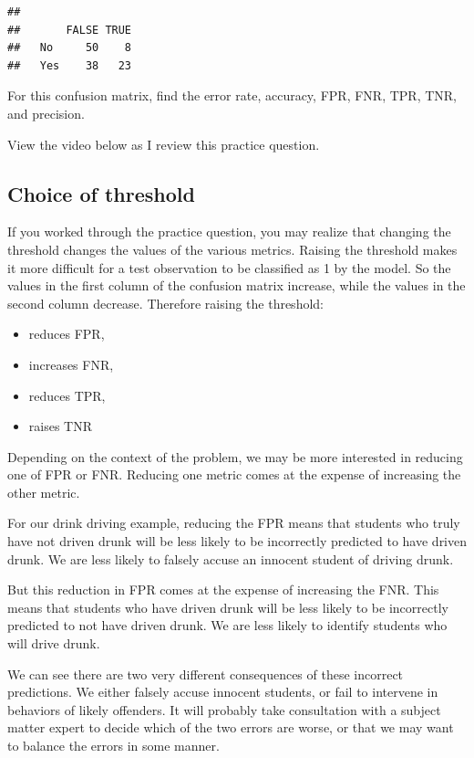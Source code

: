 \documentclass[
]{book}
\providecommand{\tightlist}{%
  \setlength{\itemsep}{0pt}\setlength{\parskip}{0pt}}
\begin{document}
\begin{verbatim}
##      
##       FALSE TRUE
##   No     50    8
##   Yes    38   23
\end{verbatim}

For this confusion matrix, find the error rate, accuracy, FPR, FNR, TPR, TNR, and precision.

View the video below as I review this practice question.

\hypertarget{choice-of-threshold}{%
\subsection{Choice of threshold}\label{choice-of-threshold}}

If you worked through the practice question, you may realize that changing the threshold changes the values of the various metrics. Raising the threshold makes it more difficult for a test observation to be classified as 1 by the model. So the values in the first column of the confusion matrix increase, while the values in the second column decrease. Therefore raising the threshold:

\begin{itemize}
\tightlist
\item
  reduces FPR,
\item
  increases FNR,
\item
  reduces TPR,
\item
  raises TNR
\end{itemize}

Depending on the context of the problem, we may be more interested in reducing one of FPR or FNR. Reducing one metric comes at the expense of increasing the other metric.

For our drink driving example, reducing the FPR means that students who truly have not driven drunk will be less likely to be incorrectly predicted to have driven drunk. We are less likely to falsely accuse an innocent student of driving drunk.

But this reduction in FPR comes at the expense of increasing the FNR. This means that students who have driven drunk will be less likely to be incorrectly predicted to not have driven drunk. We are less likely to identify students who will drive drunk.

We can see there are two very different consequences of these incorrect predictions. We either falsely accuse innocent students, or fail to intervene in behaviors of likely offenders. It will probably take consultation with a subject matter expert to decide which of the two errors are worse, or that we may want to balance the errors in some manner.
\end{document}
